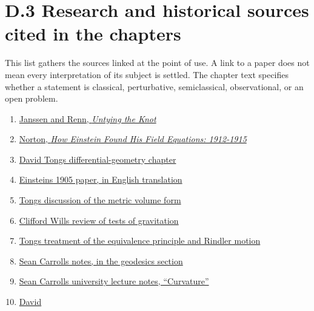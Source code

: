 \documentclass[
  11pt,
  letterpaper,
  oneside,
  openany]{scrbook}
\providecommand{\tightlist}{%
  \setlength{\itemsep}{0pt}\setlength{\parskip}{0pt}}
\begin{document}
\endgroup

\hypertarget{d.3-research-and-historical-sources-cited-in-the-chapters}{%
\section{D.3 Research and historical sources cited in the
chapters}\label{d.3-research-and-historical-sources-cited-in-the-chapters}}

This list gathers the sources linked at the point of use. A link to a
paper does not mean every interpretation of its subject is settled. The
chapter text specifies whether a statement is classical, perturbative,
semiclassical, observational, or an open problem.

\begin{enumerate}
\def\labelenumi{\arabic{enumi}.}
\tightlist
\item
  \href{https://www.mpiwg-berlin.mpg.de/Preprints/P264.PDF}{Janssen and
  Renn, \emph{Untying the Knot}}
\item
  \href{https://online.ucpress.edu/hsns/article/14/2/253/47626/How-Einstein-Found-His-Field-Equations-1912-1915}{Norton,
  \emph{How Einstein Found His Field Equations: 1912-1915}}
\item
  \href{https://davidtong.org/pdfs/teaching/general-relativity/gr2.pdf}{David
  Tong\textquotesingle s differential-geometry chapter}
\item
  \href{https://sites.pitt.edu/~jdnorton/teaching/Einstein_graduate/pdfs/Einstein_STR_1905_English.pdf}{Einstein\textquotesingle s
  1905 paper, in English translation}
\item
  \href{https://davidtong.org/pdfs/teaching/general-relativity/gr3.pdf}{Tong\textquotesingle s
  discussion of the metric volume form}
\item
  \href{https://arxiv.org/abs/1403.7377}{Clifford Will\textquotesingle s
  review of tests of gravitation}
\item
  \href{https://davidtong.org/pdfs/teaching/general-relativity/gr1.pdf}{Tong\textquotesingle s
  treatment of the equivalence principle and Rindler motion}
\item
  \href{https://arxiv.org/pdf/gr-qc/9712019}{Sean
  Carroll\textquotesingle s notes, in the geodesics section}
\item
  \href{https://ned.ipac.caltech.edu/level5/March01/Carroll3/Carroll3.html}{Sean
  Carroll\textquotesingle s university lecture notes, ``Curvature''}
\item
  \href{https://davidtong.org/pdfs/teaching/general-relativity/gr.pdf}{David
}
\end{enumerate}
\end{document}
